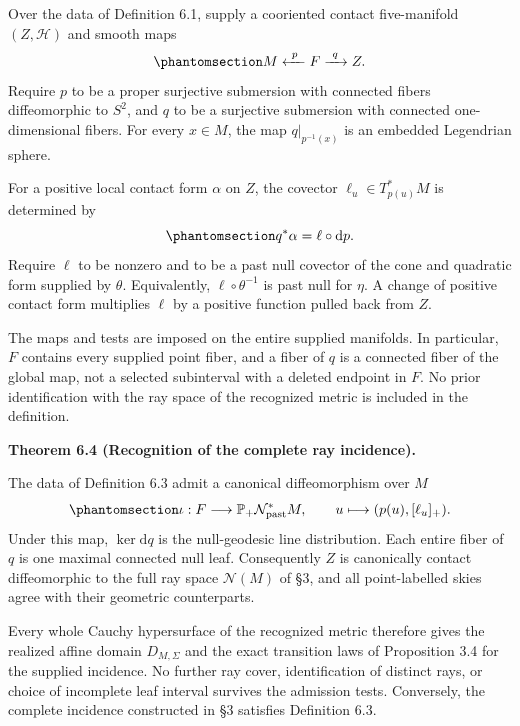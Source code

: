 \documentclass[
  english,
  11pt,
  reqno]{amsart}
\makeatletter
\newcommand{\pandocstatementheading}[1]{%
  \par\addpenalty{\@beginparpenalty}%
  \addvspace{.5\baselineskip plus .2\baselineskip minus .2\baselineskip}%
  {\normalfont\bfseries #1\par}%
  \nobreak\@afterindenttrue\@afterheading
}
\makeatother
\begin{document}
Over the data of Definition 6.1, supply a cooriented contact
five-manifold \((Z,\mathcal H)\) and smooth maps
\begin{equation}\protect\phantomsection\label{eq:global-admitted-double-fibration}{
M\xleftarrow{\ p\ }F\xrightarrow{\ q\ }Z.
}\end{equation} Require \(p\) to be a proper surjective submersion with
connected fibers diffeomorphic to \(S^2\), and \(q\) to be a surjective
submersion with connected one-dimensional fibers. For every \(x\in M\),
the map \(q|_{p^{-1}(x)}\) is an embedded Legendrian sphere.

For a positive local contact form \(\alpha\) on \(Z\), the covector
\(\ell_u\in T^*_{p(u)}M\) is determined by
\begin{equation}\protect\phantomsection\label{eq:global-admitted-contact-normal}{
q^*\alpha=\ell\circ\mathrm dp.
}\end{equation} Require \(\ell\) to be nonzero and to be a past null
covector of the cone and quadratic form supplied by \(\theta\).
Equivalently, \(\ell\circ\theta^{-1}\) is past null for \(\eta\). A
change of positive contact form multiplies \(\ell\) by a positive
function pulled back from \(Z\).

The maps and tests are imposed on the entire supplied manifolds. In
particular, \(F\) contains every supplied point fiber, and a fiber of
\(q\) is a connected fiber of the global map, not a selected subinterval
with a deleted endpoint in \(F\). No prior identification with the ray
space of the recognized metric is included in the definition.

\pandocstatementheading{\protect{}\label{thm:global-incidence-recognition}Theorem 6.4 (Recognition of the complete ray incidence).}

The data of Definition 6.3 admit a canonical diffeomorphism over \(M\)
\begin{equation}\protect\phantomsection\label{eq:global-incidence-recognition-map}{
\iota:F\longrightarrow\mathbb P_+\mathcal N^*_{\mathrm{past}}M,
\qquad
u\longmapsto(p(u),[\ell_u]_+).
}\end{equation} Under this map, \(\ker\mathrm dq\) is the null-geodesic
line distribution. Each entire fiber of \(q\) is one maximal connected
null leaf. Consequently \(Z\) is canonically contact diffeomorphic to
the full ray space \(\mathcal N(M)\) of §3, and all point-labelled skies
agree with their geometric counterparts.

Every whole Cauchy hypersurface of the recognized metric therefore gives
the realized affine domain \(D_{M,\Sigma}\) and the exact transition
laws of Proposition 3.4 for the supplied incidence. No further ray
cover, identification of distinct rays, or choice of incomplete leaf
interval survives the admission tests. Conversely, the complete
incidence constructed in §3 satisfies Definition 6.3.
\end{document}
